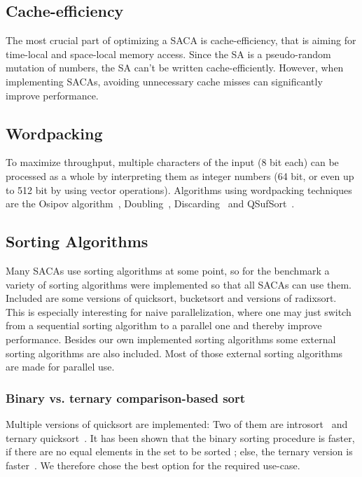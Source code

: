 \subsection{Cache-efficiency}

The most crucial part of optimizing a SACA is cache-efficiency, that is aiming for time-local and space-local memory access.
Since the SA is a pseudo-random mutation of numbers, the SA can't be written cache-efficiently.
However, when implementing SACAs, avoiding unnecessary cache misses can significantly improve performance.

\subsection{Wordpacking}

To maximize throughput, multiple characters of the input (8 bit each) can be processed as a whole by
interpreting them as integer numbers (64 bit, or even up to 512 bit by using vector operations).
Algorithms using wordpacking techniques are the Osipov algorithm~\cite{osipovGPU},
Doubling~\cite{saca:11}, Discarding~\cite{saca:11} and QSufSort~\cite{saca:1}.

\subsection{Sorting Algorithms}

Many SACAs use sorting algorithms at some point, so for the benchmark a variety of sorting algorithms were implemented so that all SACAs can use them. Included are some versions of quicksort, bucketsort and versions of radixsort.  This is especially interesting for naive parallelization, where one may just switch from a sequential sorting algorithm to a parallel one and thereby improve performance.
Besides our own implemented sorting algorithms some external sorting algorithms are also included. Most of those external sorting algorithms are made for parallel use.

\subsubsection{Binary vs. ternary comparison-based sort}

Multiple versions of quicksort are implemented:
Two of them are introsort~\cite{Musser97} and ternary quicksort~\cite{ternary_quicksort}.
It has been shown that the binary sorting procedure is faster,
if there are no equal elements in the set to be sorted ;
else, the ternary version is faster~\cite{ternary_quicksort}.
We therefore chose the best option for the required use-case.

